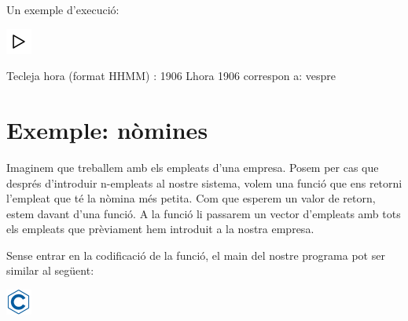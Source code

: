 \documentclass[
]{book}
\newenvironment{Shaded}{\begin{snugshade}}{\end{snugshade}}
\newcommand{\DecValTok}[1]{\textcolor[rgb]{0.00,0.00,0.81}{#1}}
\newcommand{\NormalTok}[1]{#1}
\begin{document}
Un exemple d'execució:

\includegraphics{./img/play.png}

\begin{Shaded}
\begin{Highlighting}[]
\NormalTok{Tecleja hora (format HHMM) : }\DecValTok{1906}
\NormalTok{L\textquotesingle{}hora }\DecValTok{1906}\NormalTok{ correspon a: vespre}
\end{Highlighting}
\end{Shaded}

\hypertarget{exemple-nuxf2mines-1}{%
\section{Exemple: nòmines}\label{exemple-nuxf2mines-1}}

Imaginem que treballem amb els empleats d'una empresa. Posem per cas que després d'introduir n-empleats al nostre sistema, volem una funció que ens retorni l'empleat que té la nòmina més petita.
Com que esperem un valor de retorn, estem davant d'una funció. A la funció li passarem un vector d'empleats amb tots els empleats que prèviament hem introduit a la nostra empresa.

Sense entrar en la codificació de la funció, el main del nostre programa pot ser similar al següent:

\includegraphics{./img/c.png}
\end{document}

